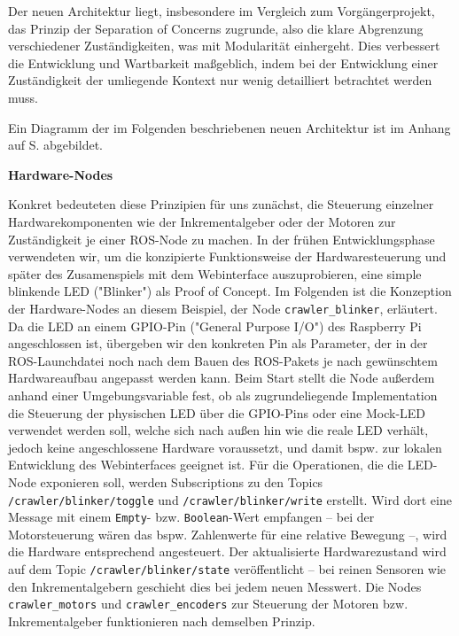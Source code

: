 Der neuen Architektur liegt, insbesondere im Vergleich zum Vorgängerprojekt, das Prinzip der Separation of Concerns zugrunde, also die klare Abgrenzung verschiedener Zuständigkeiten, was mit Modularität einhergeht. Dies verbessert die Entwicklung und Wartbarkeit maßgeblich, indem bei der Entwicklung einer Zuständigkeit der umliegende Kontext nur wenig detailliert betrachtet werden muss. 

Ein Diagramm der im Folgenden beschriebenen neuen Architektur ist im Anhang auf S. \pageref{fig:architekturdiagramm} abgebildet.

\textbf{Hardware-Nodes}

Konkret bedeuteten diese Prinzipien für uns zunächst, die Steuerung einzelner Hardwarekomponenten wie der Inkrementalgeber oder der Motoren zur Zuständigkeit je einer ROS-Node zu machen. In der frühen Entwicklungsphase verwendeten wir, um die konzipierte Funktionsweise der Hardwaresteuerung und später des Zusamenspiels mit dem Webinterface auszuprobieren, eine simple blinkende LED ("Blinker") als Proof of Concept. Im Folgenden ist die Konzeption der Hardware-Nodes an diesem Beispiel, der Node \texttt{crawler\_blinker}, erläutert. Da die LED an einem GPIO-Pin ("General Purpose I/O") des Raspberry Pi angeschlossen ist, übergeben wir den konkreten Pin als Parameter, der in der ROS-Launchdatei noch nach dem Bauen des ROS-Pakets je nach gewünschtem Hardwareaufbau angepasst werden kann. Beim Start stellt die Node außerdem anhand einer Umgebungsvariable fest, ob als zugrundeliegende Implementation die Steuerung der physischen LED über die GPIO-Pins oder eine Mock-LED verwendet werden soll, welche sich nach außen hin wie die reale LED verhält, jedoch keine angeschlossene Hardware voraussetzt, und damit bspw. zur lokalen Entwicklung des Webinterfaces geeignet ist. Für die Operationen, die die LED-Node exponieren soll, werden Subscriptions zu den Topics \texttt{/crawler/blinker/toggle} und \texttt{/crawler/blinker/write} erstellt. Wird dort eine Message mit einem \texttt{Empty}- bzw. \texttt{Boolean}-Wert empfangen -- bei der Motorsteuerung wären das bspw. Zahlenwerte für eine relative Bewegung --, wird die Hardware entsprechend angesteuert. Der aktualisierte Hardwarezustand wird auf dem Topic \texttt{/crawler/blinker/state} veröffentlicht -- bei reinen Sensoren wie den Inkrementalgebern geschieht dies bei jedem neuen Messwert. Die Nodes \texttt{crawler\_motors} und \texttt{crawler\_encoders} zur Steuerung der Motoren bzw. Inkrementalgeber funktionieren nach demselben Prinzip.

